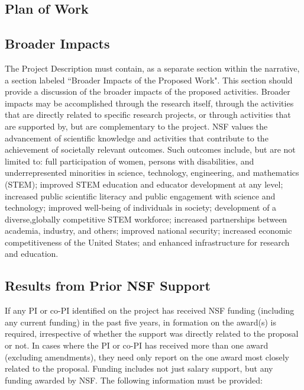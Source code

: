\subsection{Plan of Work }\label{sec:plan-of-work}


\subsection{Broader Impacts }\label{sec:broader-impacts}
The Project Description must contain, as a separate section within the narrative, a section labeled ``Broader
Impacts of the Proposed Work". This section should provide a discussion of the broader impacts of the proposed
activities. Broader impacts may be accomplished through the research itself, through the activities that are
directly related to specific research projects, or through activities that are supported by, but are complementary to
the project. NSF values the advancement of scientific knowledge and activities that contribute to the
achievement of societally relevant outcomes. Such outcomes include, but are not limited to: full
participation of women, persons with disabilities, and underrepresented minorities in science, technology, engineering, and
mathematics (STEM); improved STEM education and educator development at any level; increased public
scientific literacy and public engagement with science and technology; improved well-being of individuals in
society; development of a diverse,globally competitive STEM workforce; increased partnerships between
academia, industry, and others; improved national security; increased economic competitiveness of the United
States; and enhanced infrastructure for research and education.

\subsection{Results from Prior NSF Support }
If any PI or co-PI identified on the project has received NSF funding (including any current
funding) in the past five years, in formation on the award(s) is required,
irrespective of whether the support was directly related to the proposal or not.
In cases where the PI or co-PI has received more than one award (excluding amendments),
they need only report on the one award most closely related to the proposal. Funding includes not just salary
support, but any funding awarded by NSF. The following information must be provided:\\

